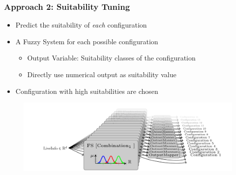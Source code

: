 \documentclass[
	10pt,
	t		%
]{beamer}
\begin{document}
\begin{frame}
	\frametitle{Approach 2: Suitability Tuning}
	\begin{itemize}
		\item Predict the suitability of \textit{each} configuration
		\item A Fuzzy System for each possible configuration
		      \begin{itemize}
			      \item Output Variable: Suitability classes of the configuration
			      \item Directly use numerical output as suitability value
		      \end{itemize}
		\item Configuration with high suitabilities are chosen
	\end{itemize}

	\begin{figure}
		\centering
		\includegraphics[width=1\textwidth]{figures/suitability-approach.png}
	\end{figure}
\end{frame}
\end{document}
